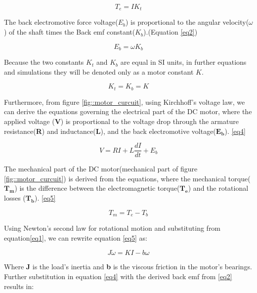 \begin{equation} \label{eq1} 
T_e = IK_t
\end{equation}

The back electromotive force voltage($E_b$) is proportional to the angular velocity($\omega$) of the shaft times the Back emf constant($K_b$).(Equation \ref{eq2})

\begin{equation} \label{eq2}
E_b = \omega K_b
\end{equation}

Because the two constants $K_t$ and $K_b$ are equal in SI units, in further equations and simulations they will be denoted only as a motor constant $K$.

\begin{equation} \label{eq3}
K_t = K_b = K
\end{equation} 

Furthermore, from figure \ref{fig::motor_curcuit}, using Kirchhoff's voltage law, we can derive the equations governing the electrical part of the DC motor, where the applied voltage (\textbf{V}) is proportional to the voltage drop through the armature resistance(\textbf{R}) and inductance(\textbf{L}), and the back electromotive voltage($\boldsymbol{E_b}$). \ref{eq4}

\begin{equation} \label{eq4}
V = RI + L\frac{dI}{dt} + E_b
\end{equation} 

The mechanical part of the DC motor(mechanical part of figure \ref{fig::motor_curcuit}) is derived from the equations, where the mechanical torque($\boldsymbol{T_m}$) is the difference between the electromagnetic torque($\boldsymbol{T_e}$) and the rotational losses ($\boldsymbol{T_b}$). \ref{eq5}

\begin{equation} \label{eq5} 
T_m = T_e - T_b
\end{equation} 

Using Newton's second law for rotational motion and substituting from equation\ref{eq1}, we can rewrite equation \ref{eq5} as:

\begin{equation} \label{eq6}
J\dot{\omega} = KI - b\omega
\end{equation}

Where \textbf{J} is the load's inertia and \textbf{b} is the viscous friction in the motor's bearings.
Further substitution in equation \ref{eq4} with the derived back emf from \ref{eq2} results in:

